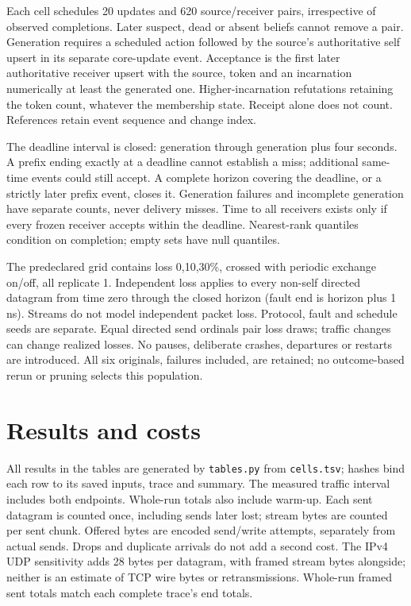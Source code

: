 \documentclass[10pt]{article}
\begin{document}
Each cell schedules 20 updates and 620 source/receiver pairs, irrespective
of observed completions. Later suspect, dead or absent beliefs cannot remove
a pair. Generation requires a scheduled action followed by the source's
authoritative self upsert in its separate core-update event. Acceptance is
the first later authoritative receiver upsert with the source, token and an
incarnation numerically at least the generated one. Higher-incarnation
refutations retaining the token count, whatever the membership state.
Receipt alone does not count. References retain event sequence and change index.

The deadline interval is closed: generation through generation plus four
seconds. A prefix ending exactly at a deadline cannot establish a miss;
additional same-time events could still accept. A complete horizon covering
the deadline, or a strictly later prefix event, closes it. Generation failures
and incomplete generation have separate counts, never delivery misses.
Time to all receivers exists only if every frozen receiver accepts within
the deadline. Nearest-rank quantiles condition on completion; empty sets
have null quantiles.

The predeclared grid contains loss 0,10,30\%, crossed with periodic exchange
on/off, all replicate 1. Independent loss applies to every non-self directed
datagram from time zero through the closed horizon (fault end is horizon
plus 1 ns). Streams do not model independent packet loss. Protocol, fault and
schedule seeds are separate. Equal directed send ordinals pair loss draws;
traffic changes can change realized losses. No pauses, deliberate crashes,
departures or restarts are introduced. All six originals, failures included,
are retained; no outcome-based rerun or pruning selects this population.

\section{Results and costs}


All results in the tables are generated by \texttt{tables.py} from
\texttt{cells.tsv}; hashes bind each row to its saved inputs, trace and summary.
The measured traffic interval includes both endpoints. Whole-run totals also
include warm-up. Each sent datagram is counted once, including sends later
lost; stream bytes are counted per sent chunk. Offered bytes are encoded
send/write attempts, separately from actual sends. Drops and duplicate
arrivals do not add a second cost. The IPv4 UDP sensitivity adds 28 bytes
per datagram, with framed stream bytes alongside; neither is an estimate of
TCP wire bytes or retransmissions. Whole-run framed sent totals match each
complete trace's end totals.
\end{document}
